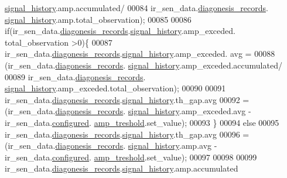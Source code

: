 \begin{DoxyCode}
      \hyperlink{a00017_affb63906d23cb1cb7787d61eaaedfb60}{signal\_history}.amp.accumulated/
00084                         ir\_sen\_data.\hyperlink{a00023_a7ae905b560513ad201e58c2f63375030}{diagonesis\_records}.
      \hyperlink{a00017_affb63906d23cb1cb7787d61eaaedfb60}{signal\_history}.amp.total\_observation);
00085 
00086             \textcolor{keywordflow}{if}(ir\_sen\_data.\hyperlink{a00023_a7ae905b560513ad201e58c2f63375030}{diagonesis\_records}.\hyperlink{a00017_affb63906d23cb1cb7787d61eaaedfb60}{signal\_history}.amp\_exceded.
      total\_observation >0)\{
00087                 ir\_sen\_data.\hyperlink{a00023_a7ae905b560513ad201e58c2f63375030}{diagonesis\_records}.\hyperlink{a00017_affb63906d23cb1cb7787d61eaaedfb60}{signal\_history}.amp\_exceded.
      avg =
00088                         (ir\_sen\_data.\hyperlink{a00023_a7ae905b560513ad201e58c2f63375030}{diagonesis\_records}.
      \hyperlink{a00017_affb63906d23cb1cb7787d61eaaedfb60}{signal\_history}.amp\_exceded.accumulated/
00089                         ir\_sen\_data.\hyperlink{a00023_a7ae905b560513ad201e58c2f63375030}{diagonesis\_records}.
      \hyperlink{a00017_affb63906d23cb1cb7787d61eaaedfb60}{signal\_history}.amp\_exceded.total\_observation);
00090                  
00091                 ir\_sen\_data.\hyperlink{a00023_a7ae905b560513ad201e58c2f63375030}{diagonesis\_records}.\hyperlink{a00017_affb63906d23cb1cb7787d61eaaedfb60}{signal\_history}.th\_gap.avg
00092                     = (ir\_sen\_data.\hyperlink{a00023_a7ae905b560513ad201e58c2f63375030}{diagonesis\_records}.
      \hyperlink{a00017_affb63906d23cb1cb7787d61eaaedfb60}{signal\_history}.amp\_exceded.avg - ir\_sen\_data.\hyperlink{a00023_a94b2d1f6ea4ab334c74d24984dd27843}{configured}.
      \hyperlink{a00021_a4b3bbfb0267daea1432f2603825ade62}{amp\_treshold}.set\_value);
00093             \}
00094             \textcolor{keywordflow}{else}
00095             ir\_sen\_data.\hyperlink{a00023_a7ae905b560513ad201e58c2f63375030}{diagonesis\_records}.\hyperlink{a00017_affb63906d23cb1cb7787d61eaaedfb60}{signal\_history}.th\_gap.avg
00096                     = (ir\_sen\_data.\hyperlink{a00023_a7ae905b560513ad201e58c2f63375030}{diagonesis\_records}.
      \hyperlink{a00017_affb63906d23cb1cb7787d61eaaedfb60}{signal\_history}.amp.avg - ir\_sen\_data.\hyperlink{a00023_a94b2d1f6ea4ab334c74d24984dd27843}{configured}.
      \hyperlink{a00021_a4b3bbfb0267daea1432f2603825ade62}{amp\_treshold}.set\_value);
00097 
00098 
00099               ir\_sen\_data.\hyperlink{a00023_a7ae905b560513ad201e58c2f63375030}{diagonesis\_records}.\hyperlink{a00017_affb63906d23cb1cb7787d61eaaedfb60}{signal\_history}.amp.accumulated

\end{DoxyCode}
